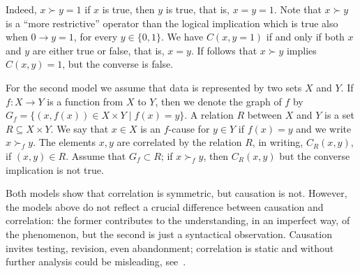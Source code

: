 \documentclass[12pt]{article}
\begin{document}
\medskip

Indeed, $x \succ y = 1$ if  $x$ is true, then $y$ is true, that is, $x=y=1$. Note that $x \succ y$ is a ``more restrictive''  operator  than the logical implication which
is true also when $0 \rightarrow  y=1$, for every $y\in\{0,1\}$. We have $C(x,y=1)$
if and only  if both $x$ and $y$ are either true or false, that is, $x=y$. If follows that  $x \succ y$ implies $C(x,y)=1$, but the converse is false.

For the second model we assume that data is represented by two sets $X$ and $Y$. If $f \colon X \rightarrow Y$ is a function from $X$ to $Y$, then we denote the graph of $f$ by $G_f =\{(x, f(x)) \in  X \times Y \mid f(x)=y\}$. A relation $R$ between $X$ and $Y$ is a set $R\subseteq X\times Y$. We say that $x\in X$ is an $f$-cause for $y\in Y$ if $f(x)=y$ and we write $x \succ_f y$.  The elements $x,y$ are correlated by the relation $R$, in writing, $C_R(x,y)$,  if $(x,y)\in R$. Assume that $G_f \subset R$; if  $x \succ_f y$, then   $C_R(x,y)$ but  the converse implication is not true.

Both models show that correlation is symmetric, but causation is not.
However, the models above  do not reflect a crucial difference
between causation and correlation: the former contributes to the understanding, in an imperfect way, of the phenomenon,
but the second is just a syntactical observation. Causation invites testing, revision, even abandonment;
correlation is static and
without further analysis could be misleading, see~\cite{spuriousweb}.
\end{document}
